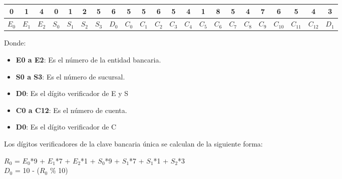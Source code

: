 \documentclass[12pt]{article} %
\begin{document}
\begin{enumerate}
\fontsize{9pt}{9pt}\selectfont
\vspace{-0.6cm}
\begin{center} 
   \begin{tabular}{|c|c|c|c|c|c|c|c|c|c|c|c|c|c|c|c|c|c|c|c|c|c|}
    \hline 
     0&1&4&0&1&2&5&6&5&5&6&5&4&1&8&5&4&7&6&5&4&3 \\ \hline 
     $E_0$&$E_1$&$E_2$&$S_0$&$S_1$&$S_2$&$S_3$&$D_0$&$C_0$&$C_1$&$C_2$&$C_3$&$C_4$&$C_5$&$C_6$&
     $C_7$&$C_8$&$C_9$&$C_{10}$&$C_{11}$&$C_{12}$&$D_1$\\ \hline 
   \end{tabular}
\end{center}   	
\fontsize{12pt}{12pt}\selectfont
Donde:
\begin{itemize}
\item {\bf E0 a E2}: Es el número de la entidad bancaria.
\item {\bf S0 a S3}: Es el número de sucursal.
\item {\bf D0}: Es el dígito verificador de E y S
\item {\bf C0 a C12}: Es el número de cuenta.
\item {\bf D0}: Es el dígito verificador de C
\end{itemize}
Los dígitos verificadores de la clave bancaria única se calculan de la siguiente forma:\\
\fontsize{10.4pt}{10.4pt}\selectfont

$R_0$ = $E_0$*9 + $E_1$*7 + $E_2$*1 + $S_0$*9 + $S_1$*7 + $S_1$*1 + $S_2$*3 \\
$D_0$ = 10 - ($R_0$ \% 10)\\


\end{enumerate}
\end{document}
